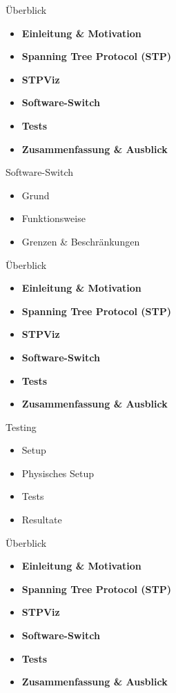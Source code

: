 \documentclass{beamer}
\begin{document}
\begin{frame}{Überblick}
    \begin{itemize}
        \item \textbf{Einleitung \& Motivation}
        \item \textbf{Spanning Tree Protocol (STP)}
        \item \textbf{STPViz}
        \item \alert{\textbf{Software-Switch}}
        \item \textbf{Tests}
        \item \textbf{Zusammenfassung \& Ausblick}
    \end{itemize}
\end{frame}

\begin{frame}{Software-Switch}
    \begin{itemize}
        \item Grund
        \item Funktionsweise
        \item Grenzen \& Beschränkungen
    \end{itemize}
\end{frame}

\begin{frame}{Überblick}
    \begin{itemize}
        \item \textbf{Einleitung \& Motivation}
        \item \textbf{Spanning Tree Protocol (STP)}
        \item \textbf{STPViz}
        \item \textbf{Software-Switch}
        \item \alert{\textbf{Tests}}
        \item \textbf{Zusammenfassung \& Ausblick}
    \end{itemize}
\end{frame}

\begin{frame}{Testing}
    \begin{itemize}
        \item Setup
        \item Physisches Setup
        \item Tests
        \item Resultate
    \end{itemize}
\end{frame}

\begin{frame}{Überblick}
    \begin{itemize}
        \item \textbf{Einleitung \& Motivation}
        \item \textbf{Spanning Tree Protocol (STP)}
        \item \textbf{STPViz}
        \item \textbf{Software-Switch}
        \item \textbf{Tests}
        \item \alert{\textbf{Zusammenfassung \& Ausblick}}
    \end{itemize}
\end{frame}
\end{document}
